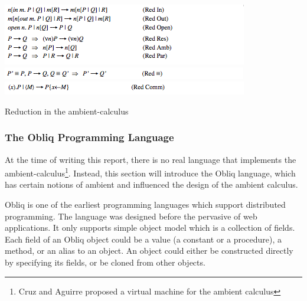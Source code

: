 \begin{table} [p]
  \begin{center}
  \includegraphics[scale=1]{ambient_red_1.png}
  \includegraphics[scale=1]{ambient_red_2.png}
  \includegraphics[scale=1]{ambient_red_3.png}
  \end{center}
  \caption{Reduction in the ambient-calculus}
  \label{ambient-red}
\end{table}

\subsubsection{The Obliq Programming Language}
At the time of writing this report, there is no real language that implements the ambient-calculus\footnote{Cruz and Aguirre \cite{VMAmbient} proposed a virtual machine for the ambient calculus}.  Instead,  this section will introduce the Obliq language, which has certain notions of ambient and influenced the design of the ambient calculus.

Obliq\cite{obliq} is one of the earliest programming languages which support distributed programming.  The language was designed before the pervasive of web applications.  It only supports simple object model which is a collection of fields.  Each field of an Obliq object could be a value (a constant or a procedure), a method, or an alias to an object.  An object could either be constructed directly by specifying its fields, or be cloned from other objects.  

